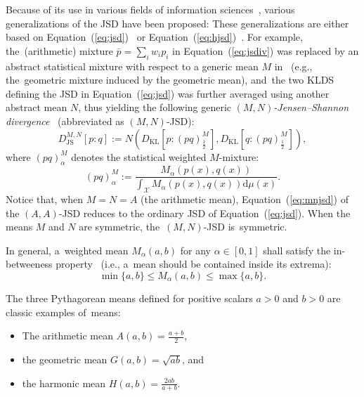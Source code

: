 \documentclass[entropy,article,accept,oneauthor,pdftex,entropy]{Definitions/mdpi}
\def\JS{\mathrm{JS}}
\def\KL{\mathrm{KL}}
\def\dmu{\mathrm{d}\mu}
\def\calX{\mathcal{X}}
\def\dmu{\mathrm{d}\mu}
\begin{document}
Because of its use in various fields of information sciences~\cite{JSApp-2009}, various generalizations of the JSD have been proposed:
These generalizations are 
either based on \mbox{Equation~(\ref{eq:jsd})}~\cite{JSsym-2019} or \mbox{Equation~(\ref{eq:hjsd})}~\cite{nielsen2010family,JensenComparative-2017,JScentroid-2020}.
For example,  the~(arithmetic) mixture $\bar{p}=\sum_i w_i p_i$ in \linebreak \mbox{Equation~(\ref{eq:jsdiv})} was replaced by an abstract statistical mixture with respect to a generic mean $M$ in~\cite{JSsym-2019} (e.g., the~geometric mixture induced by the geometric mean), and~the two KLDS defining the JSD in Equation~(\ref{eq:jsd}) was further averaged using another abstract mean $N$, thus yielding the
 following generic {\em $(M,N)$-Jensen--Shannon divergence}~\cite{JSsym-2019} (abbreviated as $(M,N)$-JSD):
\begin{equation}\label{eq:mnjsd}
D_\JS^{M,N}[p:q] :=   N\left( D_\KL\left[p:(pq)^M_{\frac{1}{2}}\right], D_\KL\left[q:(pq)^M_{\frac{1}{2}}\right]\right),
\end{equation}
where $(pq)^M_{\alpha}$ denotes the statistical weighted $M$-mixture:
\begin{equation}
(pq)^M_{\alpha}:= \frac{M_\alpha(p(x),q(x))}{\int_\calX M_\alpha(p(x),q(x))\dmu(x)}.
\end{equation}
Notice that, when $M=N=A$ (the arithmetic mean), Equation~(\ref{eq:mnjsd}) of the $(A,A)$-JSD reduces to the ordinary JSD of Equation~(\ref{eq:jsd}).
When the means $M$ and $N$ are symmetric, the~$(M,N)$-JSD is~symmetric.

In general, a~weighted mean $M_\alpha(a,b)$ for any $\alpha\in [0,1]$ shall satisfy the in-betweeness property~\cite{de2016mean} (i.e., a~mean should be contained inside its extrema):
\begin{equation}
\min\{a,b\}\leq M_\alpha(a,b)\leq \max\{a,b\}.
\end{equation}



The three Pythagorean means defined for positive scalars $a>0$ and $b>0$ are classic examples of~means: 
\begin{itemize}
\item The  arithmetic mean  $A(a,b)=\frac{a+b}{2}$, 
\item the  geometric mean  $G(a,b)=\sqrt{ab}$, and~
\item the  harmonic mean  $H(a,b)=\frac{2ab}{a+b}$.
\end{itemize}
\end{document}
